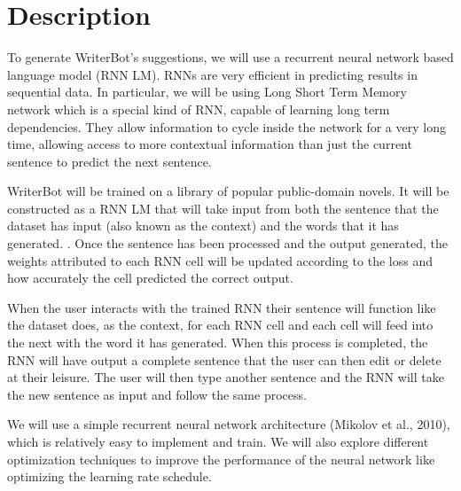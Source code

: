 \section{Description}\label{sec:description}
To generate WriterBot’s suggestions, we will use a recurrent neural network based
language model (RNN LM). RNNs are very efficient in predicting results in sequential
data. In particular, we will be using Long Short Term Memory network which is a
special kind of RNN, capable of learning long term dependencies. They allow
information to cycle inside the network for a very long time, allowing access
to more contextual information than just the current sentence to predict the next
sentence.

WriterBot will be trained on a library of popular public-domain novels. It will
be
constructed as a RNN LM that will take input from both the sentence that the dataset
has input (also known as the context) and the words that it has generated.
\cite{RNN_language_model}. Once the sentence has been processed and the output
generated, the weights attributed to each RNN cell will be updated according to
the loss and how accurately the cell predicted the correct output.

When the user interacts with the trained RNN their sentence will function like
the dataset does, as the context, for each RNN cell and each cell will feed into
the next with the word it has generated. When this process is completed, the RNN
will have output a complete sentence that the user can then edit or delete at their
leisure. The user will then type another sentence and the RNN will take the new
sentence as input and follow the same process.

We will use a simple recurrent neural network architecture (Mikolov et al., 2010),
which is relatively easy to implement and train. We will also explore different
optimization techniques to improve the performance of the neural network like
optimizing the learning rate schedule. 
